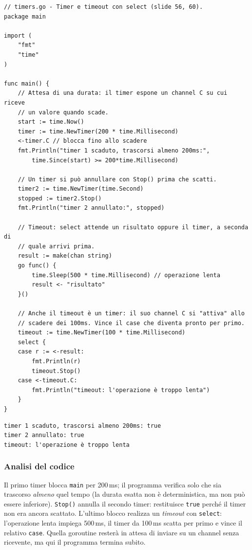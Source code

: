 \documentclass[11pt,a4paper]{report}
\newcommand{\cod}[1]{\texttt{#1}}
\begin{document}
\begin{lstlisting}[style=gocode,caption={\texttt{06\_concurrency/timers.go}}]
// timers.go - Timer e timeout con select (slide 56, 60).
package main

import (
	"fmt"
	"time"
)

func main() {
	// Attesa di una durata: il timer espone un channel C su cui riceve
	// un valore quando scade.
	start := time.Now()
	timer := time.NewTimer(200 * time.Millisecond)
	<-timer.C // blocca fino allo scadere
	fmt.Println("timer 1 scaduto, trascorsi almeno 200ms:",
		time.Since(start) >= 200*time.Millisecond)

	// Un timer si può annullare con Stop() prima che scatti.
	timer2 := time.NewTimer(time.Second)
	stopped := timer2.Stop()
	fmt.Println("timer 2 annullato:", stopped)

	// Timeout: select attende un risultato oppure il timer, a seconda di
	// quale arrivi prima.
	result := make(chan string)
	go func() {
		time.Sleep(500 * time.Millisecond) // operazione lenta
		result <- "risultato"
	}()

	// Anche il timeout è un timer: il suo channel C si "attiva" allo
	// scadere dei 100ms. Vince il case che diventa pronto per primo.
	timeout := time.NewTimer(100 * time.Millisecond)
	select {
	case r := <-result:
		fmt.Println(r)
		timeout.Stop()
	case <-timeout.C:
		fmt.Println("timeout: l'operazione è troppo lenta")
	}
}
\end{lstlisting}
\begin{lstlisting}[style=output]
timer 1 scaduto, trascorsi almeno 200ms: true
timer 2 annullato: true
timeout: l'operazione è troppo lenta
\end{lstlisting}

\subsubsection*{Analisi del codice}

Il primo timer blocca \cod{main} per 200\,ms; il programma verifica solo che sia
trascorso \emph{almeno} quel tempo (la durata esatta non è deterministica, ma non può
essere inferiore). \cod{Stop()} annulla il secondo timer: restituisce \cod{true}
perché il timer non era ancora scattato. L'ultimo blocco realizza un
\emph{timeout} con \cod{select}: l'operazione lenta impiega 500\,ms, il timer da
100\,ms scatta per primo e vince il relativo \cod{case}. Quella goroutine resterà
in attesa di inviare su un channel senza ricevente, ma qui il programma termina
subito.
\end{document}
